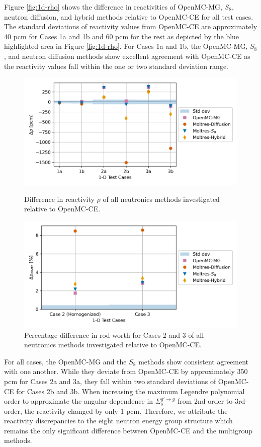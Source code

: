 \documentclass[letterpaper]{mc2025}
\begin{document}
Figure \ref{fig:1d-rho} shows the difference in reactivities of OpenMC-MG, $S_8$, neutron
diffusion, and hybrid methods relative to OpenMC-CE for all test cases. The standard deviations of
reactivity values from OpenMC-CE are approximately 40 pcm for Cases 1a and 1b and 60 pcm for the
rest as depicted by the blue highlighted area in Figure \ref{fig:1d-rho}. For Cases 1a and 1b, the
OpenMC-MG, $S_8$, and neutron diffusion methods show excellent agreement with OpenMC-CE as the
reactivity values fall within the one or two standard deviation range.
%
\begin{figure}[htb!]
  \centering
  \includegraphics[width=0.75\columnwidth]{rho}
  \caption{Difference in reactivity $\rho$ of all neutronics methods investigated relative
  to OpenMC-CE.}
  \label{fig:1d-rho}
  \includegraphics[width=0.75\columnwidth]{worth}
  \caption{Percentage difference in rod worth for Cases 2 and 3 of all neutronics methods
  investigated relative to OpenMC-CE.}
  \label{fig:1d-worth}
\end{figure}

For all cases, the OpenMC-MG and the $S_8$ methods show consistent agreement with one another. 
While they deviate from OpenMC-CE by approximately 350 pcm for Cases 2a and 3a, they fall within
two standard deviations of OpenMC-CE for Cases 2b and 3b. When increasing the maximum Legendre
polynomial order to approximate the angular dependence in $\Sigma_s^{g'\rightarrow g}$ from
2nd-order to 3rd-order, the reactivity changed by only 1 pcm. Therefore, we attribute the reactivity
discrepancies to the eight neutron energy group structure which remains the
only significant difference between OpenMC-CE and the multigroup methods.
\end{document}

